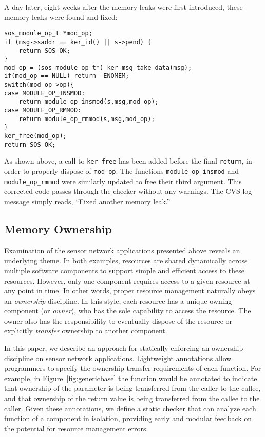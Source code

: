 A day later, eight weeks after the memory leaks were first introduced,
these memory leaks were found and fixed:



\begin{scriptsize}
\begin{verbatim}
sos_module_op_t *mod_op;
if (msg->saddr == ker_id() || s->pend) {
    return SOS_OK;
}
mod_op = (sos_module_op_t*) ker_msg_take_data(msg);
if(mod_op == NULL) return -ENOMEM;
switch(mod_op->op){
case MODULE_OP_INSMOD:
    return module_op_insmod(s,msg,mod_op);
case MODULE_OP_RMMOD:
    return module_op_rmmod(s,msg,mod_op);
}
ker_free(mod_op);
return SOS_OK;
\end{verbatim}
\end{scriptsize}



As shown above, a call to {\tt ker\_free} has been added before the final
{\tt return}, in order to properly dispose of {\tt mod\_op}.
%
The functions {\tt module\_op\_insmod} and {\tt module\_op\_rmmod} were
similarly updated to free their third argument.  
%
This corrected code passes through the checker without any warnings.  
%
The CVS log message simply reads, ``Fixed another memory leak.''  



\subsection{Memory Ownership}
\label{subsec:owner}

Examination of the sensor network applications presented above reveals an
underlying theme.  
%
In both examples, resources are shared dynamically across multiple software
components to support simple and efficient access to these resources.  
%
However, only one component requires access to a given resource at any point
in time.  
%
In other words, proper resource management naturally obeys an {\em
ownership} discipline.  
%
In this style, each resource has a unique owning component (or {\em owner}),
who has the sole capability to access the resource.  
%
The owner also has the responsibility to eventually dispose of the resource
or explicitly {\em transfer} ownership to another component.



In this paper, we describe an approach for statically enforcing an ownership
discipline on sensor network applications.  
%
Lightweight annotations allow programmers to specify the ownership transfer
requirements of each function.  
%
For example, in Figure~\ref{fig:genericbase} the  function
would be annotated to indicate that ownership of the 
parameter is being transferred from the caller to the callee, and that
ownership of the return value is being transferred from the callee to the
caller.  
%
Given these annotations, we define a static checker that can analyze each
function of a component in isolation, providing early and modular feedback
on the potential for resource management errors.



